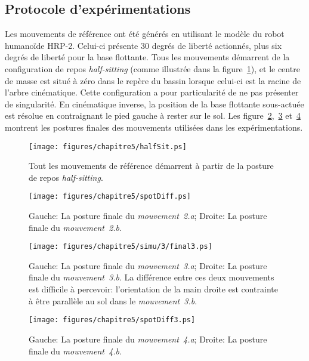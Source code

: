 \subsection{Protocole d'expérimentations}
Les mouvements de référence ont été générés en utilisant le modèle du robot humanoïde
HRP-2. Celui-ci présente 30 degrés de liberté actionnés, plus six degrés de liberté 
pour la base flottante.
Tous les mouvements démarrent de la configuration de repos \emph{half-sitting} (comme illustrée
dans la figure~\ref{fig:halfSit}),
et le centre de masse est situé à zéro dans le repère du bassin lorsque 
celui-ci est la racine de l'arbre cinématique. Cette configuration a pour particularité de ne pas présenter
de singularité.
En cinématique inverse, la position de la base flottante sous-actuée est résolue en contraignant le pied gauche
à rester sur le sol.
Les figure~\ref{fig:spotDiff1},~\ref{fig:spotDiff2} et~\ref{fig:spotDiff3} montrent les postures finales
des mouvements utilisées dans les expérimentations.
\begin{figure}[t]
\begin{center}
\texttt{[image: figures/chapitre5/halfSit.ps]}
\end{center}
\caption[Pose \emph{half-sitting}.]{Tout les mouvements de référence démarrent à partir de la posture de repos \emph{half-sitting}.}
\label{fig:halfSit}
\end{figure}
\begin{figure}[p]
  \begin{center}
    \texttt{[image: figures/chapitre5/spotDiff.ps]}
  \end{center}
  \caption[Mouvements d'atteintes.]{Gauche: La posture finale du \emph{mouvement~2.a}; Droite: La posture finale du \emph{mouvement~2.b}.}
  \label{fig:spotDiff1}
\end{figure}
\begin{figure}[p]
\begin{center}
\texttt{[image: figures/chapitre5/simu/3/final3.ps]}
\end{center}
\caption[Mouvements prise et prise orientée.]{Gauche: La posture finale du \emph{mouvement~3.a}; Droite: La posture finale du \emph{mouvement~3.b}.
La différence entre ces deux mouvements est difficile à percevoir: l'orientation de la main droite
est contrainte à être parallèle au sol dans le \emph{mouvement~3.b}.}
\label{fig:spotDiff2}
\end{figure}
\begin{figure}[p]
\begin{center}
\texttt{[image: figures/chapitre5/spotDiff3.ps]}
\end{center}
\caption[Mouvements de prise orientée et regard.]{Gauche: La posture finale du \emph{mouvement~4.a}; Droite: La posture finale du \emph{mouvement~4.b}.}
\label{fig:spotDiff3}
\end{figure}

